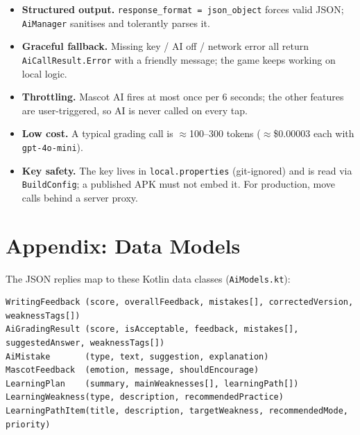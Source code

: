 \documentclass[11pt,a4paper]{article}
\begin{document}
\begin{itemize}[leftmargin=1.4cm]
  \item \textbf{Structured output.} \texttt{response\_format = json\_object}
        forces valid JSON; \texttt{AiManager} sanitises and tolerantly parses it.
  \item \textbf{Graceful fallback.} Missing key / AI off / network error all
        return \texttt{AiCallResult.Error} with a friendly message; the game
        keeps working on local logic.
  \item \textbf{Throttling.} Mascot AI fires at most once per 6 seconds; the
        other features are user-triggered, so AI is never called on every tap.
  \item \textbf{Low cost.} A typical grading call is $\approx$100--300 tokens
        ($\approx$\$0.00003 each with \texttt{gpt-4o-mini}).
  \item \textbf{Key safety.} The key lives in \texttt{local.properties}
        (git-ignored) and is read via \texttt{BuildConfig}; a published APK must
        not embed it. For production, move calls behind a server proxy.
\end{itemize}

\section{Appendix: Data Models}

The JSON replies map to these Kotlin data classes (\texttt{AiModels.kt}):

\begin{Verbatim}
WritingFeedback (score, overallFeedback, mistakes[], correctedVersion, weaknessTags[])
AiGradingResult (score, isAcceptable, feedback, mistakes[], suggestedAnswer, weaknessTags[])
AiMistake       (type, text, suggestion, explanation)
MascotFeedback  (emotion, message, shouldEncourage)
LearningPlan    (summary, mainWeaknesses[], learningPath[])
LearningWeakness(type, description, recommendedPractice)
LearningPathItem(title, description, targetWeakness, recommendedMode, priority)
\end{Verbatim}
\end{document}

